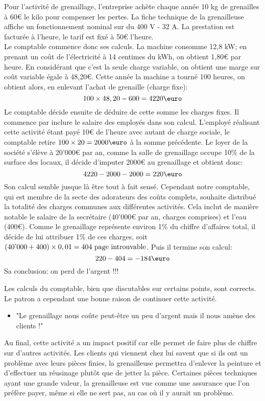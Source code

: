Pour l'activité de grenaillage, l'entreprise achète chaque année 10 kg de grenailles 
à 60\euro\/ le kilo pour compenser les pertes. La fiche technique de la grenailleuse 
affiche un fonctionnement nominal sur du 400 V - 32 A. 
La prestation est facturée à l'heure, le tarif est fixé à 50\euro\/ l'heure. \\
Le comptable commence donc ses calculs. 
La machine consomme 12,8 kW; en prenant un coût de l'électricité à 14 centimes du kWh, 
on obtient 1,80\euro\/ par heure. En considérant que c'est la seule charge variable, 
on obtient une marge sur coût variable égale à 48,20\euro.
Cette année la machine a tourné 100 heures, on obtient alors, en enlevant l'achat de grenaille 
(charge fixe):
\[
100 \times 48,20 - 600 = 4220\text{\euro}
\]
Le comptable décide ensuite de déduire de cette somme les charges fixes. 
Il commence par inclure le salaire des employés dans son calcul. 
L'employé réalisant cette 
activité étant payé 10\euro\/ de l'heure avec autant de charge sociale, le 
comptable retire $100 \times 20 = 2000 \text{\euro}$ à la somme précédente.
Le loyer de la société s'élève à 20'000\euro\/ par an, comme la salle de 
grenaillage occupe 10\% de la surface des locaux, il décide d'imputer 2000\euro\/
au grenaillage et obtient donc:
\[
4220 - 2000 - 2000 = 220\text{\euro}
\]
Son calcul semble jusque là être tout à fait sensé. 
Cependant notre comptable, qui est membre de la secte des adorateurs des coûts complets, 
souhaite distribué la totalité des charges communes aux différentes activités.
Cela inclut de manière notable le salaire de la secrétaire (40'000\euro\/ par an, 
charges comprises) et l'eau (400\euro). Comme le grenaillage représente environ 
1\% du chiffre d'affaires total, il décide de lui attribuer 1\% de ces charges, 
soit $(40\text{'}000 + 400) \times 0,\/01 = 404 \text{ page introuvable}$.
Puis il termine son calcul:
\[
220 - 404 = -184\text{\euro}
\]
Sa conclusion: on perd de l'argent !!!

Les calculs du comptable, bien que discutables sur certains points, 
sont corrects. 
Le patron a cependant une bonne raison de continuer cette activité.
\begin{itemize}
  \item "Le grenaillage nous coûte peut-être un peu d'argent 
  mais il nous amène des clients !"
\end{itemize}
Au final, cette activité a un impact positif car elle permet 
de faire plus de chiffre sur d'autres activités. 
Les clients qui viennent chez lui savent que si ils ont un 
problème avec leurs pièces finies, la grenailleuse permettra 
d'enlever la peinture et d'effectuer un réusinage plutôt que 
de jetter la pièce. Certaines pièces techniques ayant une grande 
valeur, la grenailleuse est vue comme une assurance que l'on 
préfère payer, même si elle ne sert pas,
au cas où il y aurait un problème.

